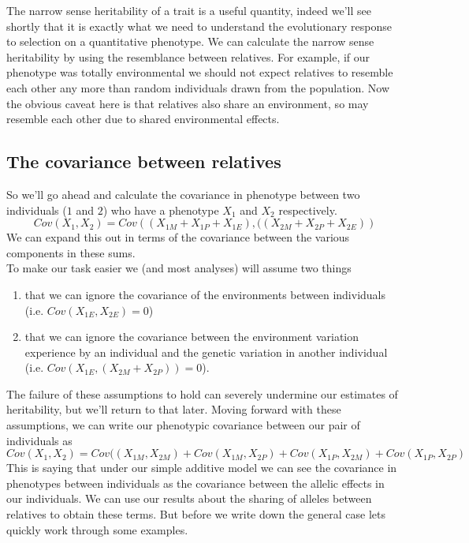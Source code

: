 The narrow sense heritability of a trait is a useful quantity, indeed
we'll see shortly that it is exactly what we need to understand the
evolutionary response to selection on a quantitative phenotype. We can
calculate the narrow sense heritability by using the resemblance between
relatives. For example, if our phenotype was totally environmental we
should not expect relatives to resemble each other any more than random
individuals drawn from the population. Now the obvious caveat here is
that relatives also share an environment, so may resemble each other
due to shared environmental effects. \\

\subsection{The covariance between relatives}
So we'll go ahead and calculate the covariance in phenotype between two individuals
($1$ and $2$) who have a phenotype $X_1$ and $X_2$ respectively.
\begin{equation}
Cov(X_1,X_2) =
Cov\left((X_{1M}+X_{1P}+X_{1E}),((X_{2M}+X_{2P}+X_{2E}) \right)
\end{equation}
We can expand this out in terms of the covariance between the various
components in these sums.\\

To make our task easier we (and most analyses) will assume two things
\begin{enumerate}
\item that we can ignore the covariance of the environments
between individuals (i.e. $Cov(X_{1E},X_{2E})=0$)
\item that we can ignore the covariance
between the environment variation experience by an individual and the
genetic variation in another individual (i.e. $Cov(X_{1E},(X_{2M}+X_{2P}))=0$).
\end{enumerate}

The failure of these assumptions
to hold can severely undermine our estimates of heritability, but we'll
return to that later. Moving forward with these assumptions, we can
write our phenotypic covariance between our pair of individuals as
\begin{equation}
Cov(X_1,X_2) =
Cov((X_{1M},X_{2M})+Cov(X_{1M},X_{2P})+Cov(X_{1P},X_{2M})
+Cov(X_{1P},X_{2P}) \label{cov_rels_1}
\end{equation}
This is saying that under our simple additive model we can see the
covariance in phenotypes between individuals as the covariance between
the allelic effects in our individuals. We can use our results about
the sharing of alleles between relatives to obtain these terms.
But before we write down the general case lets quickly work through some
examples. \\


